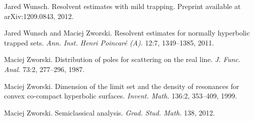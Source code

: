 \documentclass[reqno, 12pt]{amsart}
\theoremstyle{definition}
\numberwithin{equation}{section}
\numberwithin{prop}{section}
\numberwithin{figure}{section}
\begin{document}
\begin{thebibliography}{00}
 Jared Wunsch. Resolvent estimates with mild trapping.  Preprint available at arXiv:1209.0843, 2012.

 Jared Wunsch and Maciej Zworski. Resolvent estimates for normally hyperbolic trapped sets. \textit{Ann. Inst. Henri Poincar\'e (A).} 12:7, 1349--1385, 2011.

 Maciej Zworski. Distribution of poles for scattering on the real line. \textit{J. Func. Anal.} 73:2, 277--296, 1987.

 Maciej Zworski. Dimension of the limit set and the density of resonances for convex co-compact hyperbolic surfaces. \textit{Invent. Math.} 136:2, 353--409, 1999.

 Maciej Zworski. Semiclassical analysis. \textit{Grad. Stud. Math.} 138, 2012.
\end{thebibliography}
\end{document}
